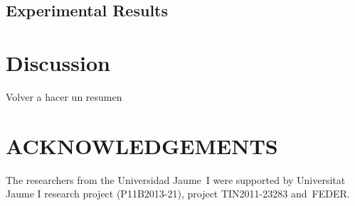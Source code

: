 \documentclass[a4paper,twoside]{article}
\begin{document}
\subsection{Experimental Results}

\section{Discussion}
\label{sec:discussion}
Volver a hacer un resumen

\section*{\uppercase{Acknowledgements}}
The researchers from the Universidad Jaume~I were supported by Universitat Jaume I research project (P11B2013-21), project
TIN2011-23283 and~FEDER.


{\small
}
\end{document}
